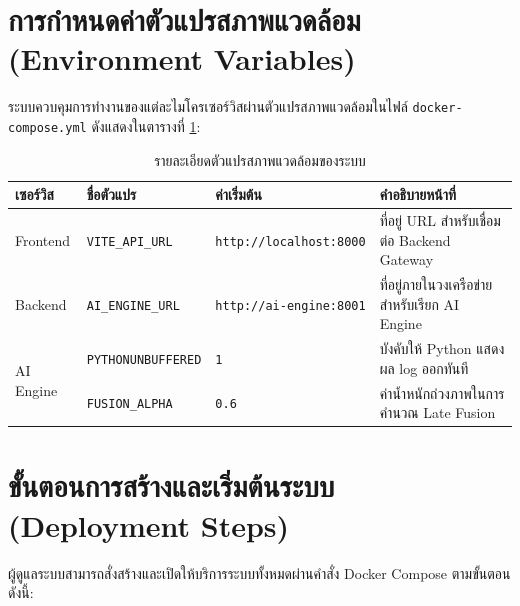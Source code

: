 \section{การกำหนดค่าตัวแปรสภาพแวดล้อม (Environment Variables)}
ระบบควบคุมการทำงานของแต่ละไมโครเซอร์วิสผ่านตัวแปรสภาพแวดล้อมในไฟล์ \texttt{docker-compose.yml} ดังแสดงในตารางที่ \ref{tab:env_vars}:

\begin{table}[htbp]
\centering
\small
\caption{รายละเอียดตัวแปรสภาพแวดล้อมของระบบ}
\label{tab:env_vars}
\begin{tabular}{p{2.5cm}p{3.5cm}p{3.5cm}p{4cm}}
\toprule
\textbf{เซอร์วิส} & \textbf{ชื่อตัวแปร} & \textbf{ค่าเริ่มต้น} & \textbf{คำอธิบายหน้าที่} \\
\midrule
Frontend & \texttt{VITE\_API\_URL} & \texttt{http://localhost:8000} & ที่อยู่ URL สำหรับเชื่อมต่อ Backend Gateway \\
\midrule
Backend & \texttt{AI\_ENGINE\_URL} & \texttt{http://ai-engine:8001} & ที่อยู่ภายในวงเครือข่ายสำหรับเรียก AI Engine \\
\midrule
\multirow{2}{*}{AI Engine} & \texttt{PYTHONUNBUFFERED} & \texttt{1} & บังคับให้ Python แสดงผล log ออกทันที \\
 & \texttt{FUSION\_ALPHA} & \texttt{0.6} & ค่าน้ำหนักถ่วงภาพในการคำนวณ Late Fusion \\
\bottomrule
\end{tabular}
\end{table}

\section{ขั้นตอนการสร้างและเริ่มต้นระบบ (Deployment Steps)}
ผู้ดูแลระบบสามารถสั่งสร้างและเปิดให้บริการระบบทั้งหมดผ่านคำสั่ง Docker Compose ตามขั้นตอนดังนี้:

